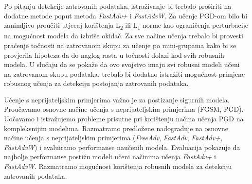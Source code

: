 \documentclass[times, utf8, zavrsni, numeric]{fer}
\begin{document}
Po pitanju detekcije zatrovanih podataka, istraživanje bi trebalo proširiti na dodatne metode poput metoda \textit{FastAdv+} i \textit{FastAdvW}.
Za učenje PGD-om bilo bi zanimljivo proučiti utjecaj korištenja L\textsubscript{2} ili L\textsubscript{1} norme kao ograničenja perturbacije na mogućnost modela da izbriše okidač.
Za sve načine učenja trebalo bi provesti praćenje točnosti na zatrovanom skupu za učenje po mini-grupama kako bi se provjerila hipoteza da do naglog rasta u točnosti dolazi kod svih robusnih modela.
U slučaju da se pokaže da ovo svojstvo imaju svi robusni modeli učeni na zatrovanom skupu podataka, trebalo bi dodatno istražiti mogućnost primjene robusnog učenja za detekciju postojanja zatrovanih podataka.




\begin{sazetak}

Učenje s neprijateljskim primjerima važno je za postizanje sigurnih modela. 
Proučavamo osnovne načine učenja s neprijateljskim primjerima (FGSM, PGD). 
Uočavamo i istražujemo probleme prisutne pri korištenju načina učenja PGD na kompleksnijim modelima.
Razmatramo predložene nadogradnje na osnovne načine učenja s neprijateljskim primjerima (\textit{FreeAdv}, \textit{FastAdv}, \textit{FastAdv+}, \textit{FastAdvW}) i evaluiramo performanse naučenih modela.
Evaluacija pokazuje da najbolje performanse postižu modeli učeni načinima učenja \textit{FastAdv+} i \textit{FastAdvW}.
Razmatramo mogućnost korištenja robusnih modela za detekciju zatrovanih podataka.

\end{sazetak}
\end{document}
